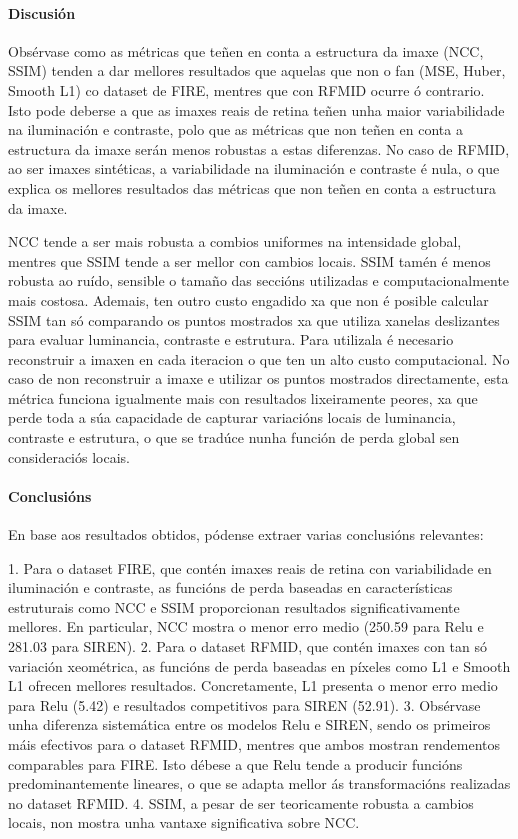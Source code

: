 \paragraph{Discusión}
\label{par:Discusión}

Obsérvase como as métricas que teñen en conta a estructura da imaxe (NCC, SSIM) tenden a dar mellores resultados que aquelas que non o fan (MSE, Huber, Smooth L1) co dataset de FIRE, mentres que con RFMID ocurre ó contrario.
Isto pode deberse a que as imaxes reais de retina teñen unha maior variabilidade na iluminación e contraste, polo que as métricas que non teñen en conta a estructura da imaxe serán menos robustas a estas diferenzas.
No caso de RFMID, ao ser imaxes sintéticas, a variabilidade na iluminación e contraste é nula, o que explica os mellores resultados das métricas que non teñen en conta a estructura da imaxe.

NCC tende a ser mais robusta a combios uniformes na intensidade global, mentres que SSIM tende a ser mellor con cambios locais.
SSIM tamén é menos robusta ao ruído, sensible o tamaño das seccións utilizadas e computacionalmente mais costosa. Ademais, ten outro custo engadido xa que non é posible calcular SSIM tan só comparando os puntos mostrados xa que utiliza xanelas deslizantes para evaluar luminancia, contraste e estrutura. 
Para utilizala é necesario reconstruir a imaxen en cada iteracion o que ten un alto custo computacional.
No caso de non reconstruir a imaxe e utilizar os puntos mostrados directamente, esta métrica funciona igualmente mais con resultados lixeiramente peores, xa que perde toda a súa capacidade de capturar variacións locais de luminancia, contraste e estrutura, o que se tradúce nunha función de perda global sen consideraciós locais.

\paragraph{Conclusións}
\label{par:Conclusións}

En base aos resultados obtidos, pódense extraer varias conclusións relevantes:

1. Para o dataset FIRE, que contén imaxes reais de retina con variabilidade en iluminación e contraste, as funcións de perda baseadas en características estruturais como NCC e SSIM proporcionan resultados significativamente mellores. En particular, NCC mostra o menor erro medio (250.59 para Relu e 281.03 para SIREN).
2. Para o dataset RFMID, que contén imaxes con tan só variación xeométrica, as funcións de perda baseadas en píxeles como L1 e Smooth L1 ofrecen mellores resultados. Concretamente, L1 presenta o menor erro medio para Relu (5.42) e resultados competitivos para SIREN (52.91).
3. Obsérvase unha diferenza sistemática entre os modelos Relu e SIREN, sendo os primeiros máis efectivos para o dataset RFMID, mentres que ambos mostran rendementos comparables para FIRE. Isto débese a que Relu tende a producir funcións predominantemente lineares, o que se adapta mellor ás transformacións realizadas no dataset RFMID.
4. SSIM, a pesar de ser teoricamente robusta a cambios locais, non mostra unha vantaxe significativa sobre NCC.

